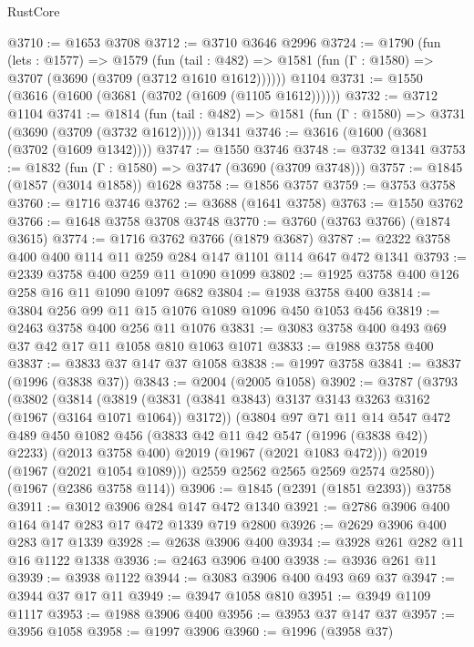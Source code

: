 \begin{lexlean}{RustCore}
\begin{coremodule}
@3710 := @1653 @3708
@3712 := @3710 @3646 @2996
@3724 := @1790
    (fun (lets : @1577) =>
    @1579
      (fun (tail : @482) => @1581 (fun (Γ : @1580) => @3707 (@3690 (@3709 (@3712 @1610 @1612))))))
    @1104
@3731 := @1550 (@3616 (@1600 (@3681 (@3702 (@1609 (@1105 @1612))))))
@3732 := @3712 @1104
@3741 := @1814
    (fun (tail : @482) => @1581 (fun (Γ : @1580) => @3731 (@3690 (@3709 (@3732 @1612)))))
    @1341
@3746 := @3616 (@1600 (@3681 (@3702 (@1609 @1342))))
@3747 := @1550 @3746
@3748 := @3732 @1341
@3753 := @1832 (fun (Γ : @1580) => @3747 (@3690 (@3709 @3748)))
@3757 := @1845 (@1857 (@3014 @1858)) @1628
@3758 := @1856 @3757
@3759 := @3753 @3758
@3760 := @1716 @3746
@3762 := @3688 (@1641 @3758)
@3763 := @1550 @3762
@3766 := @1648 @3758 @3708 @3748
@3770 := @3760 (@3763 @3766) (@1874 @3615)
@3774 := @1716 @3762 @3766 (@1879 @3687)
@3787 := @2322 @3758 @400 @400 @114 @11 @259 @284 @147 @1101 @114 @647 @472 @1341
@3793 := @2339 @3758 @400 @259 @11 @1090 @1099
@3802 := @1925 @3758 @400 @126 @258 @16 @11 @1090 @1097 @682
@3804 := @1938 @3758 @400
@3814 := @3804 @256 @99 @11 @15 @1076 @1089 @1096 @450 @1053 @456
@3819 := @2463 @3758 @400 @256 @11 @1076
@3831 := @3083 @3758 @400 @493 @69 @37 @42 @17 @11 @1058 @810 @1063 @1071
@3833 := @1988 @3758 @400
@3837 := @3833 @37 @147 @37 @1058
@3838 := @1997 @3758
@3841 := @3837 (@1996 (@3838 @37))
@3843 := @2004 (@2005 @1058)
@3902 := @3787
    (@3793
      (@3802
        (@3814
          (@3819 (@3831 (@3841 @3843) @3137 @3143 @3263 @3162 (@1967 (@3164 @1071 @1064)) @3172))
          (@3804
            @97
            @71
            @11
            @14
            @547
            @472
            @489
            @450
            @1082
            @456
            (@3833 @42 @11 @42 @547 (@1996 (@3838 @42)) @2233)
            (@2013 @3758 @400)
            @2019
            (@1967 (@2021 @1083 @472)))
          @2019
          (@1967 (@2021 @1054 @1089)))
        @2559
        @2562
        @2565
        @2569
        @2574
        @2580))
    (@1967 (@2386 @3758 @114))
@3906 := @1845 (@2391 (@1851 @2393)) @3758
@3911 := @3012 @3906 @284 @147 @472 @1340
@3921 := @2786 @3906 @400 @164 @147 @283 @17 @472 @1339 @719 @2800
@3926 := @2629 @3906 @400 @283 @17 @1339
@3928 := @2638 @3906 @400
@3934 := @3928 @261 @282 @11 @16 @1122 @1338
@3936 := @2463 @3906 @400
@3938 := @3936 @261 @11
@3939 := @3938 @1122
@3944 := @3083 @3906 @400 @493 @69 @37
@3947 := @3944 @37 @17 @11
@3949 := @3947 @1058 @810
@3951 := @3949 @1109 @1117
@3953 := @1988 @3906 @400
@3956 := @3953 @37 @147 @37
@3957 := @3956 @1058
@3958 := @1997 @3906
@3960 := @1996 (@3958 @37)

\end{coremodule}
\end{lexlean}
